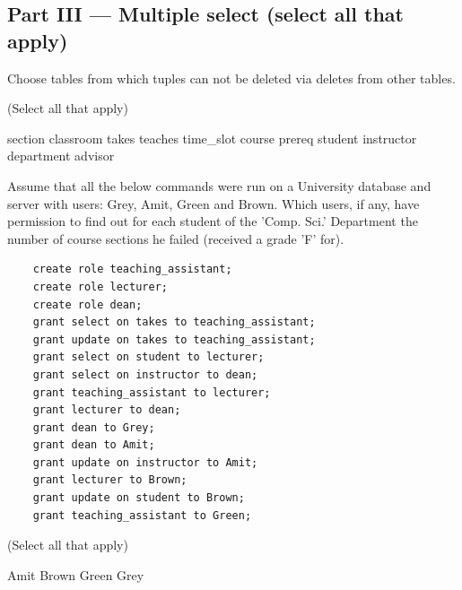 \documentclass[12pt, addpoints]{exam}
\begin{document}
\begin{questions}
\section*{Part III — Multiple select (select all that apply)}

\begin{minipage}{\linewidth}
\question[4]
Choose tables from which tuples can not be deleted via deletes from other tables.\par\vspace{0.5em}
(Select all that apply)\par\vspace{0.5em}
\begin{checkboxes}
    \choice section
    \CorrectChoice classroom
    \choice takes
    \choice teaches
    \CorrectChoice time\_slot
    \CorrectChoice course
    \choice prereq
    \CorrectChoice student
    \CorrectChoice instructor
    \CorrectChoice department
    \choice advisor
\end{checkboxes}
\end{minipage}\vspace{1em}

\begin{minipage}{\linewidth}
\question[4]
Assume that all the below commands were run on a University database and server with users: Grey, Amit, Green and Brown. 
Which users, if any, have permission to find out for each student of the 'Comp. Sci.' 
Department the number of course sections he failed (received a grade 'F' for).\par
\begin{verbatim}
    create role teaching_assistant;
    create role lecturer;
    create role dean;
    grant select on takes to teaching_assistant;
    grant update on takes to teaching_assistant;
    grant select on student to lecturer;
    grant select on instructor to dean;
    grant teaching_assistant to lecturer;
    grant lecturer to dean;
    grant dean to Grey;
    grant dean to Amit;
    grant update on instructor to Amit;
    grant lecturer to Brown;
    grant update on student to Brown;
    grant teaching_assistant to Green;
\end{verbatim}
(Select all that apply)\par\vspace{0.5em}
\begin{checkboxes}
    \CorrectChoice Amit
    \CorrectChoice Brown
    \choice Green
    \CorrectChoice Grey
\end{checkboxes}
\end{minipage}\vspace{1em}


\end{questions}
\end{document}
